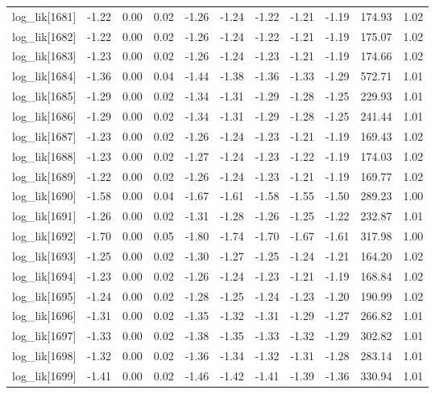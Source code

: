 \begin{table}[ht]
\begin{tabular}{rrrrrrrrrrr}
  log\_lik[1681] & -1.22 & 0.00 & 0.02 & -1.26 & -1.24 & -1.22 & -1.21 & -1.19 & 174.93 & 1.02 \\ 
  log\_lik[1682] & -1.22 & 0.00 & 0.02 & -1.26 & -1.24 & -1.22 & -1.21 & -1.19 & 175.07 & 1.02 \\ 
  log\_lik[1683] & -1.23 & 0.00 & 0.02 & -1.26 & -1.24 & -1.23 & -1.21 & -1.19 & 174.66 & 1.02 \\ 
  log\_lik[1684] & -1.36 & 0.00 & 0.04 & -1.44 & -1.38 & -1.36 & -1.33 & -1.29 & 572.71 & 1.01 \\ 
  log\_lik[1685] & -1.29 & 0.00 & 0.02 & -1.34 & -1.31 & -1.29 & -1.28 & -1.25 & 229.93 & 1.01 \\ 
  log\_lik[1686] & -1.29 & 0.00 & 0.02 & -1.34 & -1.31 & -1.29 & -1.28 & -1.25 & 241.44 & 1.01 \\ 
  log\_lik[1687] & -1.23 & 0.00 & 0.02 & -1.26 & -1.24 & -1.23 & -1.21 & -1.19 & 169.43 & 1.02 \\ 
  log\_lik[1688] & -1.23 & 0.00 & 0.02 & -1.27 & -1.24 & -1.23 & -1.22 & -1.19 & 174.03 & 1.02 \\ 
  log\_lik[1689] & -1.22 & 0.00 & 0.02 & -1.26 & -1.24 & -1.23 & -1.21 & -1.19 & 169.77 & 1.02 \\ 
  log\_lik[1690] & -1.58 & 0.00 & 0.04 & -1.67 & -1.61 & -1.58 & -1.55 & -1.50 & 289.23 & 1.00 \\ 
  log\_lik[1691] & -1.26 & 0.00 & 0.02 & -1.31 & -1.28 & -1.26 & -1.25 & -1.22 & 232.87 & 1.01 \\ 
  log\_lik[1692] & -1.70 & 0.00 & 0.05 & -1.80 & -1.74 & -1.70 & -1.67 & -1.61 & 317.98 & 1.00 \\ 
  log\_lik[1693] & -1.25 & 0.00 & 0.02 & -1.30 & -1.27 & -1.25 & -1.24 & -1.21 & 164.20 & 1.02 \\ 
  log\_lik[1694] & -1.23 & 0.00 & 0.02 & -1.26 & -1.24 & -1.23 & -1.21 & -1.19 & 168.84 & 1.02 \\ 
  log\_lik[1695] & -1.24 & 0.00 & 0.02 & -1.28 & -1.25 & -1.24 & -1.23 & -1.20 & 190.99 & 1.02 \\ 
  log\_lik[1696] & -1.31 & 0.00 & 0.02 & -1.35 & -1.32 & -1.31 & -1.29 & -1.27 & 266.82 & 1.01 \\ 
  log\_lik[1697] & -1.33 & 0.00 & 0.02 & -1.38 & -1.35 & -1.33 & -1.32 & -1.29 & 302.82 & 1.01 \\ 
  log\_lik[1698] & -1.32 & 0.00 & 0.02 & -1.36 & -1.34 & -1.32 & -1.31 & -1.28 & 283.14 & 1.01 \\ 
  log\_lik[1699] & -1.41 & 0.00 & 0.02 & -1.46 & -1.42 & -1.41 & -1.39 & -1.36 & 330.94 & 1.01 \\ 

\end{tabular}
\end{table}
